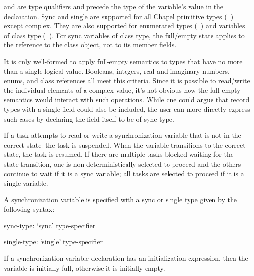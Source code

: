  and  are type qualifiers and precede
the type of the variable's value in the declaration.  Sync and single
are supported for all Chapel primitive types (~)
except complex.  They are also supported for enumerated types
(~) and variables of class type
(~).  For sync variables of class type, the
full/empty state applies to the reference to the class object, not to
its member fields.

\begin{rationale}
It is only well-formed to apply full-empty semantics to types that
have no more than a single logical value.  Booleans, integers, real
and imaginary numbers, enums, and class references all meet this
criteria.  Since it is possible to read/write the individual elements
of a complex value, it's not obvious how the full-empty semantics
would interact with such operations.  While one could argue that
record types with a single field could also be included, the user can
more directly express such cases by declaring the field itself to be
of sync type.
\end{rationale}

If a task attempts to read or write a synchronization variable that is
not in the correct state, the task is suspended.  When the variable
transitions to the correct state, the task is resumed.  If there are
multiple tasks blocked waiting for the state transition, one is
non-deterministically selected to proceed and the others continue to
wait if it is a sync variable; all tasks are selected to proceed
if it is a single variable.

%
%

A synchronization variable is specified with a sync or single type
given by the following syntax:
\begin{syntax}
sync-type:
  `sync' type-specifier

single-type:
  `single' type-specifier
\end{syntax}

If a synchronization variable declaration has an initialization
expression, then the variable is initially full, otherwise it is
initially empty.

